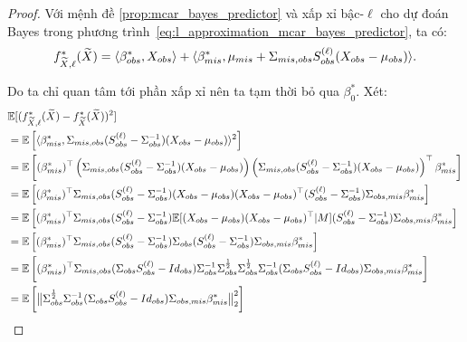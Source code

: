 
\begin{proof}
    Với mệnh đề \ref{prop:mcar_bayes_predictor} và xấp xỉ bậc-$\ell$ cho dự đoán Bayes trong phương trình~\eqref{eq:l_approximation_mcar_bayes_predictor}, ta có:
    \[
        f_{\widetilde{X}, \ell}^* (\widetilde{X}) = 
        \langle\beta_{obs}^{*},X_{obs} \rangle + \langle\beta_{mis}^{*},\mu_{mis} + \Sigma_{mis,obs} S_{obs}^{(\ell)} (X_{obs}-\mu_{obs})\rangle.
    \]

    Do ta chỉ quan tâm tới phần xấp xỉ nên ta tạm thời bỏ qua $\beta^*_0$. Xét:
    \begin{align*}
        &\E [(f_{\widetilde{X}, \ell}^*(\widetilde{X}) - f_{\widetilde{X}}^* (\widetilde{X}))^2] \\
        &= \E \left[\langle\beta_{mis}^{*},\cov_{mis,obs} (S_{obs}^{(\ell)} - \cov_{obs}^{-1} ) (X_{obs}-\mu_{obs})\rangle^2\right]  \\
        &= \E \left[ (\beta_{mis}^{*})^{\top} \left(\cov_{mis,obs} (S_{obs}^{(\ell)} - \cov_{obs}^{-1} ) (X_{obs}-\mu_{obs})\right) 
        \left(\cov_{mis,obs} (S_{obs}^{(\ell)} - \cov_{obs}^{-1} ) (X_{obs}-\mu_{obs})\right)^{\top} \beta_{mis}^*\right]  \\
        &= \E \left[ (\beta_{mis}^{*})^{\top} \cov_{mis,obs} (S_{obs}^{(\ell)} - \cov_{obs}^{-1} ) (X_{obs}-\mu_{obs})
        (X_{obs}-\mu_{obs})^{\top} (S_{obs}^{(\ell)} - \cov_{obs}^{-1} )  \cov_{obs,mis} \beta_{mis}^*\right]  \\
        &= \E \left[ (\beta_{mis}^{*})^{\top} \cov_{mis,obs} (S_{obs}^{(\ell)} - \cov_{obs}^{-1} ) 
        \E[(X_{obs}-\mu_{obs}) (X_{obs}-\mu_{obs})^{\top} |M] (S_{obs}^{(\ell)} - \cov_{obs}^{-1} )  \cov_{obs,mis} \beta_{mis}^*\right]  \\
        &= \E \left[ (\beta_{mis}^{*})^{\top} \cov_{mis,obs} (S_{obs}^{(\ell)} - \cov_{obs}^{-1} ) 
        \cov_{obs} (S_{obs}^{(\ell)} - \cov_{obs}^{-1} )  \cov_{obs,mis} \beta_{mis}^*\right]  \\
        &= \E \left[ (\beta_{mis}^{*})^{\top} \cov_{mis,obs} (\cov_{obs} S_{obs}^{(\ell)} - Id_{obs} ) \cov_{obs}^{-1}
        \cov_{obs}^{\frac{1}{2}} \cov_{obs}^{\frac{1}{2}}
        \cov_{obs}^{-1}(\cov_{obs} S_{obs}^{(\ell)} - Id_{obs} )  \cov_{obs,mis} \beta_{mis}^*\right]  \\
        &= \E \left[ \big\| \cov_{obs}^{\frac{1}{2}}
        \cov_{obs}^{-1}(\cov_{obs} S_{obs}^{(\ell)} - Id_{obs} )  \cov_{obs,mis} \beta_{mis}^* \big\|_2^2 \right]  \\

\end{align*}
\end{proof}

